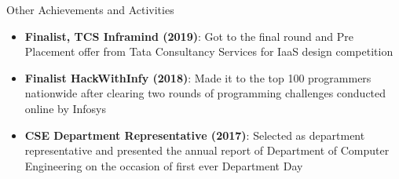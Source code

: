 \documentclass{resume} %
\begin{document}
\begin{rSection}{Other Achievements and Activities}
\begin{itemize}
            \item \textbf{Finalist, TCS Inframind (2019)}: Got to the final round and Pre Placement offer from Tata Consultancy Services for IaaS design competition
            \item \textbf{Finalist HackWithInfy (2018)}: Made it to the top 100 programmers nationwide after clearing two rounds of programming challenges conducted online by Infosys
            \item \textbf{CSE Department Representative (2017)}: Selected as department representative and presented the annual report of Department of Computer Engineering on the occasion of first ever Department Day
        \end{itemize}
    \end{rSection}
    
\end{document}

